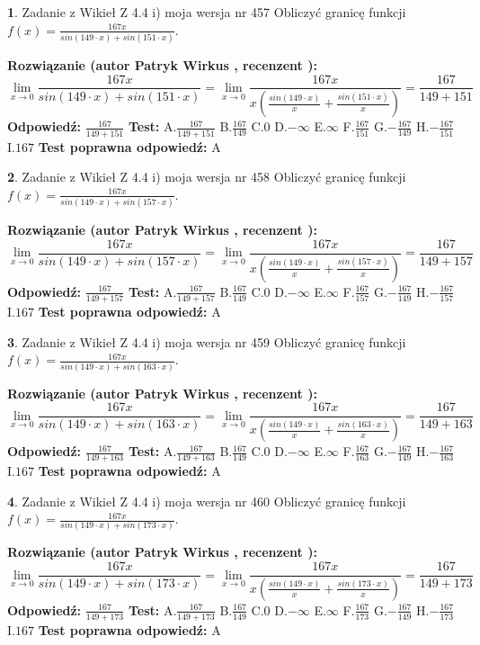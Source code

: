 \documentclass[12pt, a4paper]{article}
\theoremstyle{definition} %
\newtheorem{zad}{}
\newcommand{\zadStart}[1]{\begin{zad}#1\newline}
\newcommand{\zadStop}{\end{zad}}
\newcommand{\rozwStart}[2]{\noindent \textbf{Rozwiązanie (autor #1 , recenzent #2): }\newline}
\newcommand{\rozwStop}{\newline}
\newcommand{\odpStart}{\noindent \textbf{Odpowiedź:}\newline}
\newcommand{\odpStop}{\newline}
\newcommand{\testStart}{\noindent \textbf{Test:}\newline}
\newcommand{\testStop}{\newline}
\newcommand{\kluczStart}{\noindent \textbf{Test poprawna odpowiedź:}\newline}
\newcommand{\kluczStop}{\newline}
\begin{document}
\zadStart{Zadanie z Wikieł Z 4.4 i) moja wersja nr 457}
Obliczyć granicę funkcji $f(x)=\frac{167x}{sin(149\cdot x) +sin(151\cdot x)}$.
\zadStop
\rozwStart{Patryk Wirkus}{}
$$\lim\limits_{x\to 0}\frac{167x}{sin(149\cdot x) +sin(151\cdot x)}=\lim\limits_{x\to 0}\frac{167x}{x(\frac{sin(149\cdot x)}{x}+\frac{sin(151\cdot x)}{x})}=\frac{167}{149+151}$$
\rozwStop
\odpStart
$\frac{167}{149+151}$
\odpStop
\testStart
A.$\frac{167}{149+151}$
B.$\frac{167}{149}$
C.$0$
D.$-\infty$
E.$\infty$
F.$\frac{167}{151}$
G.$-\frac{167}{149}$
H.$-\frac{167}{151}$
I.$167$
\testStop
\kluczStart
A
\kluczStop



\zadStart{Zadanie z Wikieł Z 4.4 i) moja wersja nr 458}
Obliczyć granicę funkcji $f(x)=\frac{167x}{sin(149\cdot x) +sin(157\cdot x)}$.
\zadStop
\rozwStart{Patryk Wirkus}{}
$$\lim\limits_{x\to 0}\frac{167x}{sin(149\cdot x) +sin(157\cdot x)}=\lim\limits_{x\to 0}\frac{167x}{x(\frac{sin(149\cdot x)}{x}+\frac{sin(157\cdot x)}{x})}=\frac{167}{149+157}$$
\rozwStop
\odpStart
$\frac{167}{149+157}$
\odpStop
\testStart
A.$\frac{167}{149+157}$
B.$\frac{167}{149}$
C.$0$
D.$-\infty$
E.$\infty$
F.$\frac{167}{157}$
G.$-\frac{167}{149}$
H.$-\frac{167}{157}$
I.$167$
\testStop
\kluczStart
A
\kluczStop



\zadStart{Zadanie z Wikieł Z 4.4 i) moja wersja nr 459}
Obliczyć granicę funkcji $f(x)=\frac{167x}{sin(149\cdot x) +sin(163\cdot x)}$.
\zadStop
\rozwStart{Patryk Wirkus}{}
$$\lim\limits_{x\to 0}\frac{167x}{sin(149\cdot x) +sin(163\cdot x)}=\lim\limits_{x\to 0}\frac{167x}{x(\frac{sin(149\cdot x)}{x}+\frac{sin(163\cdot x)}{x})}=\frac{167}{149+163}$$
\rozwStop
\odpStart
$\frac{167}{149+163}$
\odpStop
\testStart
A.$\frac{167}{149+163}$
B.$\frac{167}{149}$
C.$0$
D.$-\infty$
E.$\infty$
F.$\frac{167}{163}$
G.$-\frac{167}{149}$
H.$-\frac{167}{163}$
I.$167$
\testStop
\kluczStart
A
\kluczStop



\zadStart{Zadanie z Wikieł Z 4.4 i) moja wersja nr 460}
Obliczyć granicę funkcji $f(x)=\frac{167x}{sin(149\cdot x) +sin(173\cdot x)}$.
\zadStop
\rozwStart{Patryk Wirkus}{}
$$\lim\limits_{x\to 0}\frac{167x}{sin(149\cdot x) +sin(173\cdot x)}=\lim\limits_{x\to 0}\frac{167x}{x(\frac{sin(149\cdot x)}{x}+\frac{sin(173\cdot x)}{x})}=\frac{167}{149+173}$$
\rozwStop
\odpStart
$\frac{167}{149+173}$
\odpStop
\testStart
A.$\frac{167}{149+173}$
B.$\frac{167}{149}$
C.$0$
D.$-\infty$
E.$\infty$
F.$\frac{167}{173}$
G.$-\frac{167}{149}$
H.$-\frac{167}{173}$
I.$167$
\testStop
\kluczStart
A
\kluczStop
\end{document}
